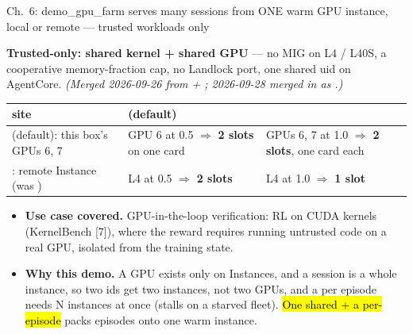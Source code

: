 \begin{frame}{Ch.\ 6: demo\_gpu\_farm serves many sessions from ONE warm GPU instance, local or remote --- trusted workloads only}
{\footnotesize\textbf{Trusted-only: shared kernel + shared GPU} --- no MIG on L4 / L40S, a cooperative memory-fraction cap, no Landlock port, one shared uid on AgentCore. \textit{(Merged 2026-09-26 from  + ; 2026-09-28  merged in as .)}\par}
\vspace{2mm}
\footnotesize
\begin{tabularx}{\textwidth}{@{}>{\raggedright\arraybackslash}p{4.6cm} Y Y@{}}
\toprule
\textbf{site} &  \textbf{(default)} & \\
\midrule
{} (default): this box's GPUs 6, 7 & GPU 6 at 0.5 $\Rightarrow$ \textbf{2 slots} on one card & GPUs 6, 7 at 1.0 $\Rightarrow$ \textbf{2 slots}, one card each\\
: remote  Instance (was ) & L4 at 0.5 $\Rightarrow$ \textbf{2 slots} & L4 at 1.0 $\Rightarrow$ \textbf{1 slot}\\
\bottomrule
\end{tabularx}
\par\vspace{1.5mm}
\begin{itemize}\scriptsize\setlength{\itemsep}{1.4mm}
\item \textbf{\color{awsteal}Use case covered.} GPU-in-the-loop verification: RL on CUDA kernels (KernelBench [7]), where the reward requires running untrusted code on a real GPU, isolated from the training state.
\item \textbf{\color{awsteal}Why this demo.} A GPU exists only on Instances, and a session is a whole instance, so two ids get two instances, not two GPUs, and a  per episode needs N instances at once (stalls on a starved fleet). \hl{One shared  + a per-episode } packs episodes onto one warm instance.
\end{itemize}
\end{frame}

